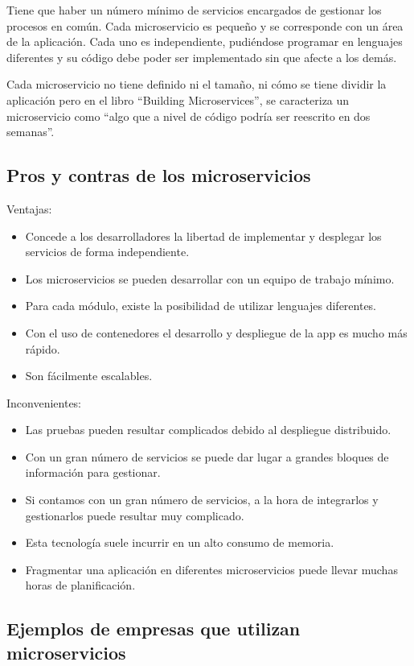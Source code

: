 \documentclass[12pt]{report} %
\begin{document}
Tiene que haber un número mínimo de servicios encargados de gestionar los procesos en común. Cada microservicio es pequeño y se corresponde con un área de la aplicación. Cada uno es independiente, pudiéndose programar en lenguajes diferentes y su código debe poder ser implementado sin que afecte a los demás.

Cada microservicio no tiene definido ni el tamaño, ni cómo se tiene dividir la aplicación pero en el libro “Building Microservices”, \cite{BuildingMicroservices}se caracteriza un microservicio como “algo que a nivel de código podría ser reescrito en dos semanas”.

\subsection{Pros y contras de los microservicios}
Ventajas:
\begin{itemize}
	\item Concede a los desarrolladores la libertad de implementar y desplegar los servicios de forma independiente.
	\item Los microservicios se pueden desarrollar con un equipo de trabajo mínimo.
	\item Para cada módulo, existe la posibilidad de utilizar lenguajes diferentes.
	\item Con el uso de contenedores el desarrollo y despliegue de la app es mucho más rápido.
	\item Son fácilmente escalables.
\end{itemize}
Inconvenientes:
\begin{itemize}
	\item Las pruebas pueden resultar complicados debido al despliegue distribuido.
	\item Con un gran número de servicios se puede dar lugar a grandes bloques de información para gestionar.
	\item Si contamos con un gran número de servicios, a la hora de integrarlos y gestionarlos puede resultar muy complicado.
	\item Esta tecnología suele incurrir en un alto consumo de memoria.
	\item Fragmentar una aplicación en diferentes microservicios puede llevar muchas horas de planificación.
\end{itemize}

\subsection{Ejemplos de empresas que utilizan microservicios}
\end{document}
